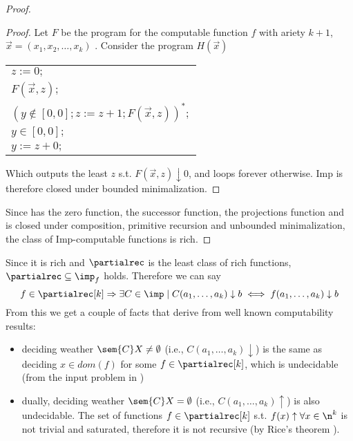\begin{proof}
  \begin{proof}
    Let \(F\) be the program for the computable function \(f\)
    with ariety \(k+1\), \(\vec{x} = (x_1, x_2, \dots, x_k)\)
    . Consider the program \(H(\vec{x})\)
    \begin{center}
      \begin{tabular}{l}
        \(z := 0;\)\\[0pt]
        \(F(\vec{x},z);\)\\[0pt]
        \((y \not\in [0,0];z := z + 1;F(\vec{x},z))^*;\)\\[0pt]
        \(y\in [0,0];\)\\[0pt]
        \(y := z + 0;\)\\[0pt]
      \end{tabular}

    \end{center}
    Which outputs the least \(z\) s.t. \(F(\vec{x},z) \downarrow 0\),
    and loops forever otherwise. Imp is therefore closed under bounded
    minimalization.
  \end{proof}
  Since has the zero function, the successor function, the projections
  function and is closed under composition, primitive recursion and
  unbounded minimalization, the class of Imp-computable functions is
  rich.
\end{proof}

Since it is rich and \(\partialrec\) is the least class of rich
functions, \(\partialrec \subseteq \imp_f\) holds. Therefore we can
say \[f \in \partialrec[k] \Rightarrow \exists C \in \imp \mid C(a_1,
\dots, a_k)\downarrow b \iff f(a_1, \dots, a_k) \downarrow b\] From
this we get a couple of facts that derive from well known
computability results:
\begin{itemize}
\item deciding weather \(\sem{C}X \neq \emptyset\) (i.e., \(C(a_1,
  \dots, a_k) \downarrow\)) is the same as deciding \(x \in dom(f)\)
  for some \(f \in \partialrec[k]\), which is undecidable (from the
  input problem in \cite[p.~104]{cutland1980computability})
\item dually, deciding weather \(\sem{C}X = \emptyset\) (i.e.,
  \(C(a_1, \dots, a_k)\uparrow\)) is also undecidable. The set of
  functions \(f\in \partialrec[k]\) s.t. \(f(x) \uparrow \forall x \in
  \n^k\) is not trivial and saturated, therefore it is not recursive
  (by Rice's theorem \cite{rice1953classes}).
\end{itemize}
